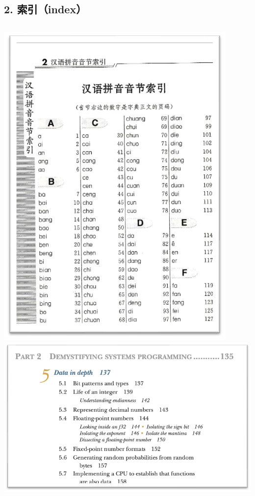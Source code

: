 \documentclass[aspectratio=169, 14pt]{beamer}
\begin{document}
\begin{frame}
    \section{\textcolor{darkmidnightblue}{2. 索引（index）}}

\end{frame}

\begin{frame}
    \begin{columns}
        \includegraphics[width=.8\textwidth]{week11/dict}
        \includegraphics[width=.99\textwidth]{week11/book}
    \end{columns}
\end{frame}
\end{document}
